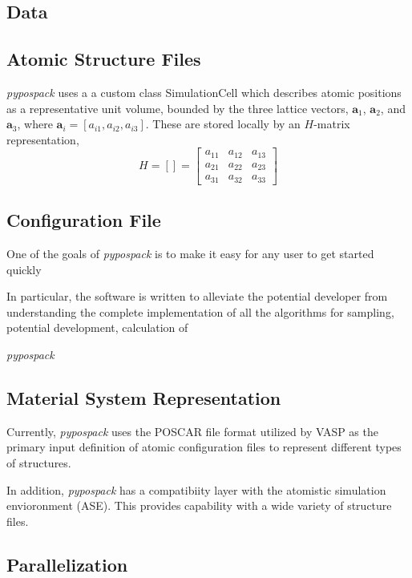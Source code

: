 \subsection{Data}
\subsection{Atomic Structure Files}

\emph{pypospack} uses a a custom class SimulationCell which describes atomic positions as a representative unit volume, bounded by the three lattice vectors, $\bm{a}_1$, $\bm{a}_2$, and $\bm{a}_3$, where $\bm{a}_i=[a_{i1},a_{i2},a_{i3}]$.  These are stored locally by an $H$-matrix representation,
\begin{equation}\label{eq:H-matrix}
     H=\left[\right] =
      \begin{bmatrix}
        a_{11}&a_{12}&a_{13}\\
        a_{21}&a_{22}&a_{23}\\
        a_{31}&a_{32}&a_{33}
      \end{bmatrix}
\end{equation}

\subsection{Configuration File}
One of the goals of \emph{pypospack} is to make it easy for any user to get started quickly

In particular, the software is written to alleviate the potential developer from understanding the complete implementation of all the algorithms for sampling, potential development, calculation of


\emph{pypospack}
\subsection{Material System Representation}

Currently, \emph{pypospack} uses the POSCAR file format utilized by VASP as the primary input definition of atomic configuration files to represent different types of structures.

In addition, \emph{pypospack} has a compatibiity layer with the atomistic simulation envioronment (ASE).  This provides capability with a wide variety of structure files.

\subsection{Parallelization}

